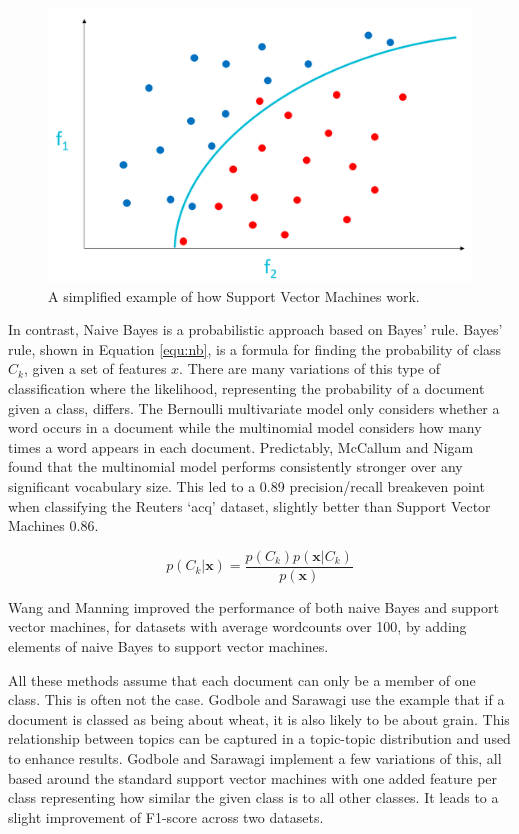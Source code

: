 		\begin{figure}
    		\centering
    		\includegraphics[width=0.5\linewidth]{resources/images/svm_simple.png}
    		\caption{A simplified example of how Support Vector Machines work.}
    		\label{fig:svm_simple}
		\end{figure} 

			In contrast, Naive Bayes is a probabilistic approach based on Bayes' rule. Bayes' rule, shown in Equation \ref{equ:nb}, is a formula for finding the probability of class $C_k$, given a set of features $x$. There are many variations of this type of classification where the likelihood, representing the probability of a document given a class, diﬀers. The Bernoulli multivariate model only considers whether a word occurs in a document while the multinomial model considers how many times a word appears in each document. Predictably, McCallum and Nigam found that the multinomial model performs consistently stronger over any significant vocabulary size. This led to a 0.89 precision/recall breakeven point when classifying the Reuters `acq' dataset, slightly better than Support Vector Machines 0.86.  

			\begin{equation}\label{equ:nb}
				p(C_k|\textbf{x}) = \frac{p(C_k)p(\textbf{x}|C_k)}{p(\textbf{x})}
			\end{equation}

			Wang and Manning improved the performance of both naive Bayes and support vector machines, for datasets with average wordcounts over 100, by adding elements of naive Bayes to support vector machines\cite{baselines_bigrams_wang}.  

			All these methods assume that each document can only be a member of one class. This is often not the case. Godbole and Sarawagi use the example that if a document is classed as being about wheat, it is also likely to be about grain\cite{discriminative_multilabel_godbole}. This relationship between topics can be captured in a topic-topic distribution and used to enhance results. Godbole and Sarawagi implement a few variations of this, all based around the standard support vector machines with one added feature per class representing how similar the given class is to all other classes. It leads to a slight improvement of F1-score across two datasets.
			
